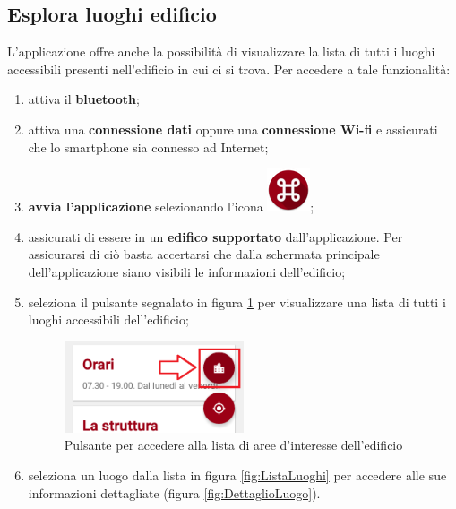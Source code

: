 \documentclass[../ClipsManualeUtente.tex]{subfiles}
\begin{document}
	\subsection{Esplora luoghi edificio}
		L'applicazione offre anche la possibilità di visualizzare la lista di tutti i luoghi accessibili presenti nell'edificio in cui ci si trova.
		Per accedere a tale funzionalità:
		\begin{enumerate}
			\item attiva il \textbf{bluetooth};
			\item attiva una \textbf{connessione dati} oppure una \textbf{connessione Wi-fi} e assicurati che lo smartphone sia connesso ad Internet;
			\item \textbf{avvia l'applicazione} selezionando l'icona \includegraphics[scale=0.4]{img/LogoApp};
			\item assicurati di essere in un \textbf{edifico supportato} dall'applicazione. Per assicurarsi di ciò basta accertarsi che dalla schermata principale dell'applicazione siano visibili le informazioni dell'edificio;
			\item seleziona il pulsante segnalato in figura \ref{fig:PulsanteTuttiLuoghi} per visualizzare una lista di tutti i luoghi accessibili dell'edificio;
			
		\begin{figure} [h]
			\centering
			\includegraphics[width=0.50\textwidth]{img2/Tutti-PulsanteTuttiLuoghi}
			\caption{Pulsante per accedere alla lista di aree d'interesse dell'edificio}
			\label{fig:PulsanteTuttiLuoghi}
		\end{figure}					
			
			\item seleziona un luogo dalla lista in figura \ref{fig:ListaLuoghi} per accedere alle sue informazioni dettagliate (figura \ref{fig:DettaglioLuogo}).
		\end{enumerate}
		
\end{document}
